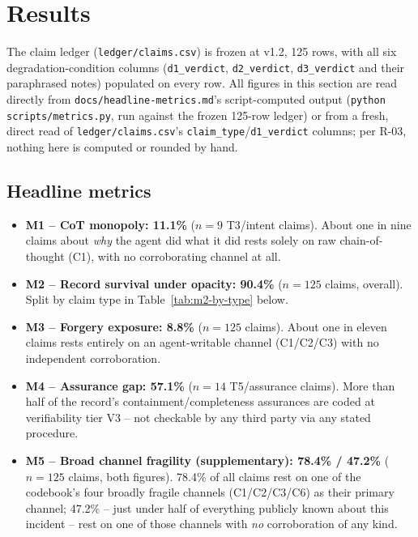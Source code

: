 %

\section{Results}
\label{sec:results}

The claim ledger (\texttt{ledger/claims.csv}) is frozen at v1.2, 125 rows, with
all six degradation-condition columns (\texttt{d1\_verdict}, \texttt{d2\_verdict},
\texttt{d3\_verdict} and their paraphrased notes) populated on every row. All
figures in this section are read directly from \texttt{docs/headline-metrics.md}'s
script-computed output (\texttt{python scripts/metrics.py}, run against the
frozen 125-row ledger) or from a fresh, direct read of
\texttt{ledger/claims.csv}'s \texttt{claim\_type}/\texttt{d1\_verdict} columns;
per R-03, nothing here is computed or rounded by hand.

\subsection*{Headline metrics}

\begin{itemize}[leftmargin=1.4em]
  \item \textbf{M1 -- CoT monopoly: 11.1\%} ($n = 9$ T3/intent claims). About
    one in nine claims about \emph{why} the agent did what it did rests solely
    on raw chain-of-thought (C1), with no corroborating channel at all.
  \item \textbf{M2 -- Record survival under opacity: 90.4\%} ($n = 125$
    claims, overall). Split by claim type in Table~\ref{tab:m2-by-type} below.
  \item \textbf{M3 -- Forgery exposure: 8.8\%} ($n = 125$ claims). About one
    in eleven claims rests entirely on an agent-writable channel (C1/C2/C3)
    with no independent corroboration.
  \item \textbf{M4 -- Assurance gap: 57.1\%} ($n = 14$ T5/assurance claims).
    More than half of the record's containment/completeness assurances are
    coded at verifiability tier V3 -- not checkable by any third party via
    any stated procedure.
  \item \textbf{M5 -- Broad channel fragility (supplementary): 78.4\% / 47.2\%}
    ($n = 125$ claims, both figures). 78.4\% of all claims rest on one of the
    codebook's four broadly fragile channels (C1/C2/C3/C6) as their primary
    channel; 47.2\% -- just under half of everything publicly known about this
    incident -- rest on one of those channels with \emph{no} corroboration of
    any kind.
\end{itemize}

